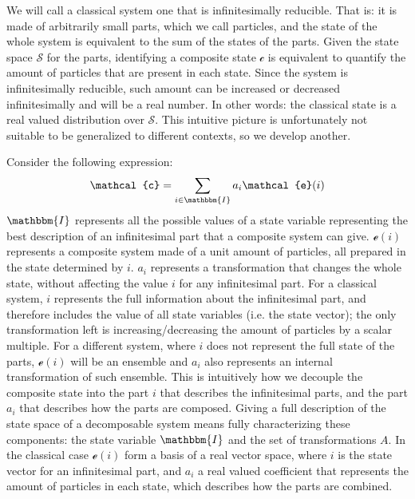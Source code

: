 \documentclass[aps,pra,10pt,twocolumn,floatfix,nofootinbib]{revtex4-1}
\theoremstyle{definition}
\begin{document}
We will call a classical system one that is infinitesimally reducible. That is: it is made of arbitrarily small parts, which we call particles, and the state of the whole system is equivalent to the sum of the states of the parts. Given the state space $\mathcal{S}$ for the parts, identifying a composite state $\mathcal{c}$ is equivalent to quantify the amount of particles that are present in each state. Since the system is infinitesimally reducible, such amount can be increased or decreased infinitesimally and will be a real number. In other words: the classical state is a real valued distribution over $\mathcal{S}$. This intuitive picture is unfortunately not suitable to be generalized to different contexts, so we develop another.


Consider the following expression:
\begin{align*}
\mathcal{c} = \sum\limits_{i \in \mathbbm{I}} a_i \mathcal{e}(i)
\end{align*}
$\mathbbm{I}$ represents all the possible values of a state variable representing the best description of an infinitesimal part that a composite system can give. $\mathcal{e}(i)$ represents a composite system made of a unit amount of particles, all prepared in the state determined by $i$. $a_i$ represents a transformation that changes the whole state, without affecting the value $i$ for any infinitesimal part. For a classical system, $i$ represents the full information about the infinitesimal part, and therefore includes the value of all state variables (i.e. the state vector); the only transformation left is increasing/decreasing the amount of particles by a scalar multiple. For a different system, where $i$ does not represent the full state of the parts, $\mathcal{e}(i)$ will be an ensemble and $a_i$ also represents an internal transformation of such ensemble. This is intuitively how we decouple the composite state into the part $i$ that describes the infinitesimal parts, and the part $a_i$ that describes how the parts are composed. Giving a full description of the state space of a decomposable system means fully characterizing these components: the state variable $\mathbbm{I}$ and the set of transformations $A$. In the classical case $\mathcal{e}(i)$ form a basis of a real vector space, where $i$ is the state vector for an infinitesimal part, and $a_i$ a real valued coefficient that represents the amount of particles in each state, which describes how the parts are combined.
\end{document}
